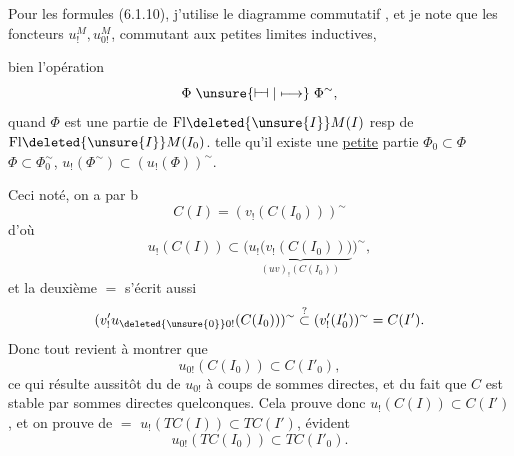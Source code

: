 Pour les formules (6.1.10), j'utilise
le diagramme commutatif
,
et je note que les foncteurs $u_{!}^{M},u_{0!}^{M}$, commutant aux petites limites inductives,  


 bien   l'opération
\[
\Phi\mathrel{\unsure{\vdash\joinrel\dashv|\longmapsto}}\Phi^{\sim},
\]
quand $\Phi$ est une partie de $\mathrm{Fl}\deleted{\unsure{I}}M(I)$
resp de $\mathrm{Fl}\deleted{\unsure{I}}M(I_{0})$. 
telle qu'il existe une \uline{petite} partie
$\Phi_{0}\subset\Phi$  $\Phi\subset\Phi_{0}^{\sim}$,
$u_{!}(\Phi^{\sim})\subset(u_{!}(\Phi))^{\sim}$.

Ceci noté, on a par b
\[
 C(I)=(v_{!}(C(I_{0})))^{\sim}
\]
d'où
\[
 u_{!}(C(I))\subset
 \bigl(\underbrace{u_{!}\bigl(v_{!}(C(I_{0}))\bigr)}_{(uv)_{!}(C(I_{0}))}\bigr)^{\sim},
\]
et la deuxième $=$ s'écrit aussi
\[
 (v'_{!}u_{\deleted{\unsure{0}}0!}(C(I_{0})))^{\sim}
 \overset{?}{\subset}(v'_{!}(I'_{0}))^{\sim}=C(I').
\]
Donc tout revient à montrer que
\[
 u_{0!}(C(I_{0}))\subset C(I'_{0}),\tag*{(6.1.16)}
\]
ce qui résulte aussitôt du 
de $u_{0!}$ à coups de sommes directes,
et du fait que $C$ est stable par
sommes directes quelconques. Cela
prouve donc $u_{!}(C(I))\subset C(I')$, et on
prouve de $=$ $u_{!}(TC(I))\subset TC(I')$,
  évident
\[
 u_{0!}(TC(I_{0}))\subset TC(I'_{0}).\tag*{(6.1.17)}
\]

